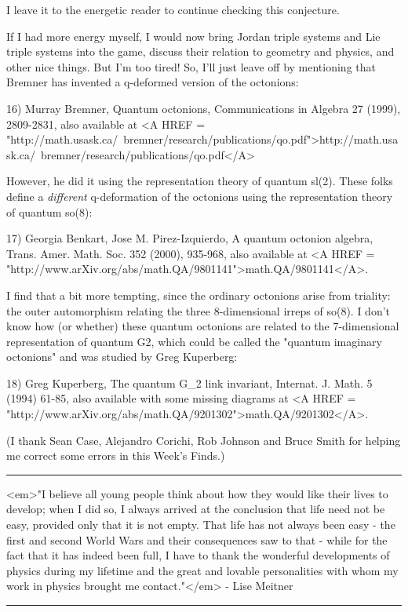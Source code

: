 I leave it to the energetic reader to continue checking this conjecture.

If I had more energy myself, I would now bring Jordan triple systems and
Lie triple systems into the game, discuss their relation to geometry and
physics, and other nice things.  But I'm too tired!  So, I'll just leave
off by mentioning that Bremner has invented a q-deformed version of the
octonions:

16) Murray Bremner, Quantum octonions, Communications in Algebra 
27 (1999), 2809-2831, also available at 
<A HREF = "http://math.usask.ca/~bremner/research/publications/qo.pdf">http://math.usask.ca/~bremner/research/publications/qo.pdf</A>

However, he did it using the representation theory of quantum sl(2).
These folks define a \emph{different} q-deformation of the octonions using
the representation theory of quantum so(8):

17) Georgia Benkart, Jose M. Pirez-Izquierdo, A quantum octonion 
algebra, Trans. Amer. Math. Soc. 352 (2000), 935-968, also available at 
<A HREF = "http://www.arXiv.org/abs/math.QA/9801141">math.QA/9801141</A>.

I find that a bit more tempting, since the ordinary octonions arise from
triality: the outer automorphism relating the three 8-dimensional irreps
of so(8).  I don't know how (or whether) these quantum octonions are
related to the 7-dimensional representation of quantum G2, which could
be called the "quantum imaginary octonions" and was studied by Greg
Kuperberg:

18) Greg Kuperberg, The quantum G_{2} link invariant, Internat. 
J. Math. 5 (1994) 61-85, also available with some missing diagrams at
<A HREF = "http://www.arXiv.org/abs/math.QA/9201302">math.QA/9201302</A>.

(I thank Sean Case, Alejandro Corichi, Rob Johnson and Bruce Smith
for helping me correct some errors in this Week's Finds.)  
\par\noindent\rule{\textwidth}{0.4pt}
<em>"I believe all young people think about how they would like their
lives to develop; when I did so, I always arrived at the conclusion
that life need not be easy, provided only that it is not empty. 
That life has not always been easy - the first and second World
Wars and their consequences saw to that - while for the fact that it has
indeed been full, I have to thank the wonderful developments of
physics during my lifetime and the great and lovable personalities
with whom my work in physics brought me contact."</em> - Lise Meitner


\par\noindent\rule{\textwidth}{0.4pt}

